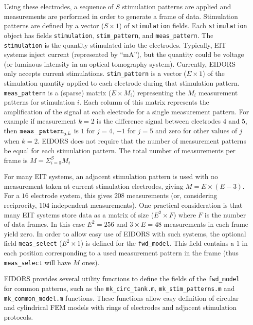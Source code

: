 \documentclass[12pt]{iopart}
\begin{document}
Using these electrodes, a sequence of $S$ stimulation
patterns are applied and measurements are performed
in order to generate a frame of data.
Stimulation patterns are defined by a vector
($S\times1$) of {\tt stimulation} fields. Each
{\tt stimulation} object has fields
{\tt stimulation}, 
{\tt stim\_pattern}, and
{\tt meas\_pattern}. The {\tt stimulation} is
the quantity stimulated into the electrodes. Typically,
EIT systems inject current (represented by ``mA''),
but the quantity could be voltage (or luminous
intensity in an optical tomography system). Currently,
EIDORS only accepts current stimulations.
{\tt stim\_pattern} is a vector ($E\times1$)
of the stimulation quantity applied to each electrode
during that stimulation pattern.
{\tt meas\_pattern} is a (sparse) matrix ($E{\times}M_i$) 
representing the $M_i$ measurement patterns for
stimulation $i$. Each column of this matrix represents
the amplification of the signal at each electrode for
a single measurement pattern. For example if measurement
$k=2$ is the difference signal between electrodes 4 and 5,
then ${\tt meas\_pattern}_{j,k}$ is $1$ for $j=4$,  $-1$
for $j=5$ and zero for other values of $j$ when $k=2$.
EIDORS does not require that the number of measurement
patterns be equal for each stimulation pattern. 
The total number of measurements per frame is
$ M = \Sigma_{i=0}^{S} M_i$

For many EIT systems, an adjacent stimulation
pattern is used with no measurement taken at current
stimulation electrodes, giving $M = E\times(E-3)$.
For a $16$ electrode system, this gives $208$
measurements (or, considering reciprocity, $104$ independent
measurements). One practical consideration is that
many EIT systems store data as a matrix of size
($E^2{\times}F$) where $F$ is the number of data
frames. In this case $E^2= 256$ and $3{\times}E = 48$ measurements
in each frame yield zero. In order to allow easy 
use of EIDORS with such systems, the optional
field {\tt meas\_select} ($E^2\times1$) is defined
for the {\tt fwd\_model}. This field contains a 
$1$ in each position corresponding to a used measurement
pattern in the frame (thus {\tt meas\_select} will
have $M$ ones).

EIDORS provides several utility functions to define
the fields of the {\tt fwd\_model} for common 
patterns, such as the
{\tt mk\_circ\_tank.m},
{\tt mk\_stim\_patterns.m} and
{\tt mk\_common\_model.m} functions. These functions
allow easy definition of circular and cylindrical
FEM models with rings of electrodes and adjacent
stimulation protocols.
\end{document}
